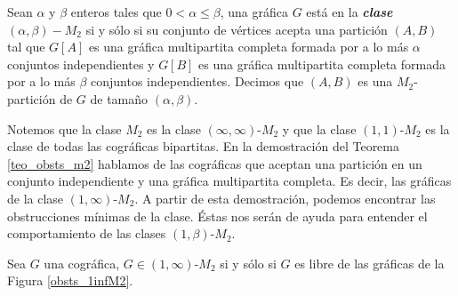 Sean $\alpha$ y $\beta$ enteros tales que $0 < \alpha \le \beta$, una gr\'afica $G$ est\'a en la \emph{\textbf{clase $(\alpha, \beta)-M_2$}}  si y sólo si su conjunto de vértices acepta una partición $(A,B)$ tal que $G[A]$ es una gráfica multipartita completa formada por a lo más $\alpha$ conjuntos independientes y $G[B]$ es una gráfica multipartita completa formada por a lo más $\beta$ conjuntos independientes. Decimos que $(A,B)$ es una $M_2$-partición de $G$ de tamaño $(\alpha, \beta)$.

Notemos que la clase $M_2$ es la clase $(\infty, \infty)$-$M_2$ y que la clase $(1,1)$-$M_2$ es la clase de todas las cográficas bipartitas. En la demostración del Teorema \ref{teo_obsts_m2} %
 hablamos de las cográficas que aceptan una partición en un conjunto independiente y una gráfica multipartita completa. Es decir, las gráficas de la clase $(1,\infty)$-$M_2$. A partir de esta demostración, podemos encontrar las obstrucciones mínimas de la clase. Éstas nos serán de ayuda para entender el comportamiento de las clases $(1,\beta)$-$M_2$.

\begin{lemma}

Sea $G$ una cográfica, $G\in(1,\infty)$-$M_2$ si y sólo si $G$ es libre de las gráficas de la Figura \ref{obsts_1infM2}.

\end{lemma}

